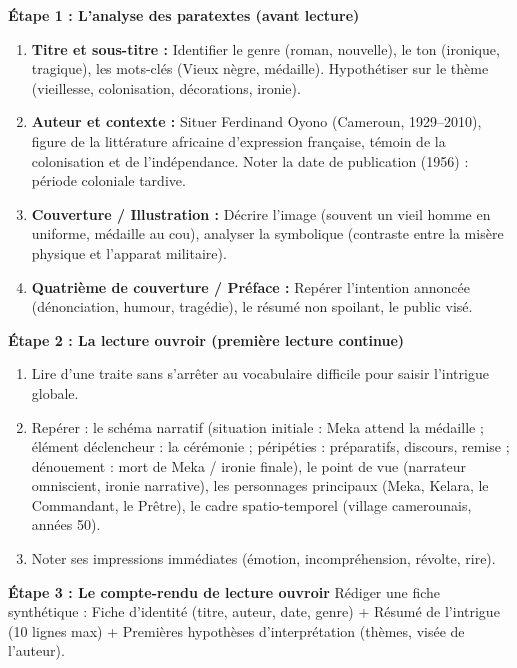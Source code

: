 \documentclass[11pt]{article}
\newcommand{\cle}[1]{{\popxbold\color{popdark}#1}}
\begin{document}
\begin{methode}
\textbf{Étape 1 : L'analyse des paratextes (avant lecture)}
\begin{enumerate}
    \item \textbf{Titre et sous-titre :} Identifier le genre (roman, nouvelle), le ton (ironique, tragique), les mots-clés (\cle{Vieux nègre}, \cle{médaille}). Hypothétiser sur le thème (vieillesse, colonisation, décorations, ironie).
    \item \textbf{Auteur et contexte :} Situer Ferdinand Oyono (Cameroun, 1929–2010), figure de la littérature africaine d'expression française, témoin de la colonisation et de l'indépendance. Noter la date de publication (1956) : période coloniale tardive.
    \item \textbf{Couverture / Illustration :} Décrire l'image (souvent un vieil homme en uniforme, médaille au cou), analyser la symbolique (contraste entre la misère physique et l'apparat militaire).
    \item \textbf{Quatrième de couverture / Préface :} Repérer l'intention annoncée (dénonciation, humour, tragédie), le résumé non spoilant, le public visé.
\end{enumerate}
\textbf{Étape 2 : La lecture ouvroir (première lecture continue)}
\begin{enumerate}
    \item Lire d'une traite sans s'arrêter au vocabulaire difficile pour saisir l'intrigue globale.
    \item Repérer : le \cle{schéma narratif} (situation initiale : Meka attend la médaille ; élément déclencheur : la cérémonie ; péripéties : préparatifs, discours, remise ; dénouement : mort de Meka / ironie finale), le \cle{point de vue} (narrateur omniscient, ironie narrative), les \cle{personnages principaux} (Meka, Kelara, le Commandant, le Prêtre), le \cle{cadre spatio-temporel} (village camerounais, années 50).
    \item Noter ses impressions immédiates (émotion, incompréhension, révolte, rire).
\end{enumerate}
\textbf{Étape 3 : Le compte-rendu de lecture ouvroir}
Rédiger une fiche synthétique : Fiche d'identité (titre, auteur, date, genre) + Résumé de l'intrigue (10 lignes max) + Premières hypothèses d'interprétation (thèmes, visée de l'auteur).
\end{methode}
\end{document}
